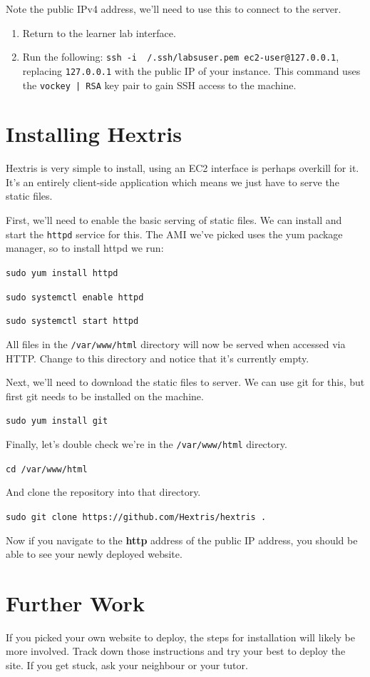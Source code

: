 \documentclass{csse4400}
\begin{document}
Note the public IPv4 address, we'll need to use this to connect to the server.

\begin{enumerate}
    \item Return to the learner lab interface.
    \item Run the following: \texttt{ssh -i ~/.ssh/labsuser.pem ec2-user@127.0.0.1}, replacing \texttt{127.0.0.1} with the public IP of your instance.
          This command uses the \texttt{vockey | RSA} key pair to gain SSH access to the machine.
\end{enumerate}

\section{Installing Hextris}
Hextris is very simple to install, using an EC2 interface is perhaps overkill for it.
It's an entirely client-side application which means we just have to serve the static files.

First, we'll need to enable the basic serving of static files.
We can install and start the \texttt{httpd} service for this.
The AMI we've picked uses the yum package manager, so to install httpd we run:

\texttt{sudo yum install httpd}

\texttt{sudo systemctl enable httpd}

\texttt{sudo systemctl start httpd}

All files in the \texttt{/var/www/html} directory will now be served when accessed via HTTP.
Change to this directory and notice that it's currently empty.

Next, we'll need to download the static files to server.
We can use git for this, but first git needs to be installed on the machine.

\texttt{sudo yum install git}

Finally, let's double check we're in the \texttt{/var/www/html} directory.

\texttt{cd /var/www/html}

And clone the repository into that directory.

\texttt{sudo git clone https://github.com/Hextris/hextris .}

Now if you navigate to the \textbf{http} address of the public IP address, you should be able to see your newly deployed website.

\section{Further Work}
If you picked your own website to deploy, the steps for installation will likely be more involved.
Track down those instructions and try your best to deploy the site.
If you get stuck, ask your neighbour or your tutor.



\end{document}
